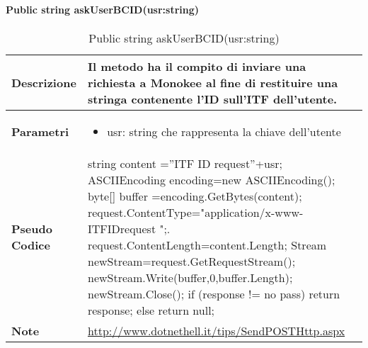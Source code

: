     \paragraph{Public string askUserBCID(usr:string)}
    \begin{center}
        \begin{longtable}{|p{3cm}|p{9cm}|}%
        \caption{Public string askUserBCID(usr:string)}
        \label{tab:public-string-askUserBCIDImpl}
        \endfirsthead
        \endhead
        \hline
        \textbf{Descrizione} & Il metodo ha il compito di inviare una richiesta a Monokee al fine di restituire una stringa contenente l’ID sull’ITF dell’utente. \\
        \hline
        \textbf{Parametri} &      
            \begin{itemize}
                \item usr: string che rappresenta la chiave dell’utente
            \end{itemize}
        \\
        \hline
        \textbf{Pseudo Codice} & 
        string content =”ITF ID request”+usr;\newline
        ASCIIEncoding encoding=new ASCIIEncoding();\newline
        byte[]  buffer =encoding.GetBytes(content);\newline
        request.ContentType="application/x-www-ITFIDrequest ";\newline.
        request.ContentLength=content.Length;\newline
        Stream newStream=request.GetRequestStream();\newline
        newStream.Write(buffer,0,buffer.Length);\newline
        newStream.Close();\newline
        if (response != no pass) return response;\newline
        else return null;\newline
        \\
        \hline
        \textbf{Note} & \url{http://www.dotnethell.it/tips/SendPOSTHttp.aspx} \\
        \hline
        \end{longtable}
        \end{center}


